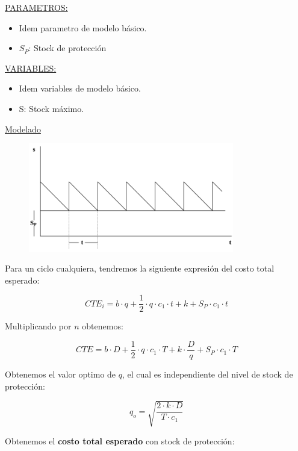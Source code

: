 \documentclass{article}
\begin{document}
\noindent
\underline{PARAMETROS:}
\begin{itemize}
    \item Idem parametro de modelo básico.
    \item \(S_P\): Stock de protección
\end{itemize}


\noindent
\underline{VARIABLES:}
\begin{itemize}
    \item Idem variables de modelo básico.
    \item S: Stock máximo.
\end{itemize}


\underline{Modelado}


\begin{figure}[h!]
    \includegraphics[width=0.8\textwidth]{imagenes/stock-proteccion.png}
\end{figure}

Para un ciclo cualquiera, tendremos la siguiente expresión del costo total esperado:

\begin{equation}
    CTE_i= b \cdot q+\frac{1}{2} \cdot q \cdot c_1 \cdot t + k + S_P \cdot c_1 \cdot t
\end{equation}

Multiplicando por \(n\) obtenemos:

\begin{equation}
    CTE= b \cdot D +\frac{1}{2} \cdot q \cdot c_1 \cdot T + k \cdot \frac{D}{q} + S_P \cdot c_1 \cdot T
\end{equation}

Obtenemos el valor optimo de \(q\), el cual es independiente del nivel de stock de protección:

\begin{equation}
    q_o = \sqrt{\frac{2 \cdot k \cdot D}{T \cdot c_1}}
\end{equation}

Obtenemos el \textbf{costo total esperado} con stock de protección:
\end{document}
